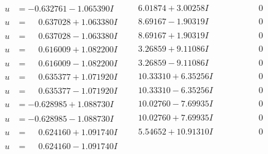 \documentclass[1p]{elsarticle_modified}
\theoremstyle{definition}
\begin{document}
$$\begin{array}{c|c|c}
\begin{aligned}
u &= -0.632761 - 1.065390 I\end{aligned}
 & \phantom{-}6.01874 + 3.00258 I & \phantom{-0.000000 } 0 \\ \hline\begin{aligned}
u &= \phantom{-}0.637028 + 1.063380 I\end{aligned}
 & \phantom{-}8.69167 - 1.90319 I & \phantom{-0.000000 } 0 \\ \hline\begin{aligned}
u &= \phantom{-}0.637028 - 1.063380 I\end{aligned}
 & \phantom{-}8.69167 + 1.90319 I & \phantom{-0.000000 } 0 \\ \hline\begin{aligned}
u &= \phantom{-}0.616009 + 1.082200 I\end{aligned}
 & \phantom{-}3.26859 + 9.11086 I & \phantom{-0.000000 } 0 \\ \hline\begin{aligned}
u &= \phantom{-}0.616009 - 1.082200 I\end{aligned}
 & \phantom{-}3.26859 - 9.11086 I & \phantom{-0.000000 } 0 \\ \hline\begin{aligned}
u &= \phantom{-}0.635377 + 1.071920 I\end{aligned}
 & \phantom{-}10.33310 + 6.35256 I & \phantom{-0.000000 } 0 \\ \hline\begin{aligned}
u &= \phantom{-}0.635377 - 1.071920 I\end{aligned}
 & \phantom{-}10.33310 - 6.35256 I & \phantom{-0.000000 } 0 \\ \hline\begin{aligned}
u &= -0.628985 + 1.088730 I\end{aligned}
 & \phantom{-}10.02760 - 7.69935 I & \phantom{-0.000000 } 0 \\ \hline\begin{aligned}
u &= -0.628985 - 1.088730 I\end{aligned}
 & \phantom{-}10.02760 + 7.69935 I & \phantom{-0.000000 } 0 \\ \hline\begin{aligned}
u &= \phantom{-}0.624160 + 1.091740 I\end{aligned}
 & \phantom{-}5.54652 + 10.91310 I & \phantom{-0.000000 } 0 \\ \hline\begin{aligned}
u &= \phantom{-}0.624160 - 1.091740 I\end{aligned}

\end{array}$$
\end{document}
